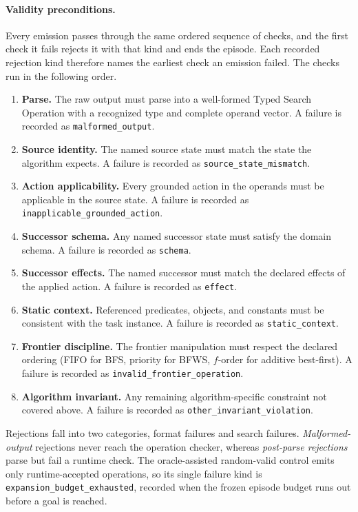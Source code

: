 \paragraph{Validity preconditions.}
Every emission passes through the same ordered sequence of checks, and the first check it fails rejects it with that kind and ends the episode. Each recorded rejection kind therefore names the earliest check an emission failed. The checks run in the following order.

\begin{enumerate}[leftmargin=*, itemsep=1pt, parsep=1pt]
\item \textbf{Parse.} The raw output must parse into a well-formed Typed Search Operation with a recognized type and complete operand vector. A failure is recorded as \texttt{malformed\_output}.
\item \textbf{Source identity.} The named source state must match the state the algorithm expects. A failure is recorded as \texttt{source\_state\_mismatch}.
\item \textbf{Action applicability.} Every grounded action in the operands must be applicable in the source state. A failure is recorded as \texttt{inapplicable\_grounded\_action}.
\item \textbf{Successor schema.} Any named successor state must satisfy the domain schema. A failure is recorded as \texttt{schema}.
\item \textbf{Successor effects.} The named successor must match the declared effects of the applied action. A failure is recorded as \texttt{effect}.
\item \textbf{Static context.} Referenced predicates, objects, and constants must be consistent with the task instance. A failure is recorded as \texttt{static\_context}.
\item \textbf{Frontier discipline.} The frontier manipulation must respect the declared ordering (FIFO for BFS, priority for BFWS, $f$-order for additive best-first). A failure is recorded as \texttt{invalid\_frontier\_operation}.
\item \textbf{Algorithm invariant.} Any remaining algorithm-specific constraint not covered above. A failure is recorded as \texttt{other\_invariant\_violation}.
\end{enumerate}

Rejections fall into two categories, format failures and search failures. \emph{Malformed-output} rejections never reach the operation checker, whereas \emph{post-parse rejections} parse but fail a runtime check. The oracle-assisted random-valid control emits only runtime-accepted operations, so its single failure kind is \texttt{expansion\_budget\_exhausted}, recorded when the frozen episode budget runs out before a goal is reached.

